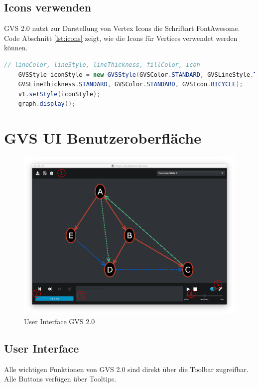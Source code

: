 \documentclass[11pt,a4paper,english,oneside]{book}
\numberwithin{equation}{chapter}
\begin{document}
	\subsection{Icons verwenden}
	GVS 2.0 nutzt zur Darstellung von Vertex Icons die Schriftart FontAwesome. Code Abschnitt \ref{lst:icons} zeigt, wie die Icons für Vertices verwendet werden können.
	
	\begin{lstlisting}[language=java, frame=single, caption={Icons benutzen}, label={lst:icons}]
	// lineColor, lineStyle, lineThickness, fillColor, icon
	GVSStyle iconStyle = new GVSStyle(GVSColor.STANDARD, GVSLineStyle.THROUGH,
	GVSLineThickness.STANDARD, GVSColor.STANDARD, GVSIcon.BICYCLE);
	v1.setStyle(iconStyle);
	graph.display();
	\end{lstlisting}	
	
	\clearpage
	
	\section{GVS UI Benutzeroberfläche}
		\begin{figure}[h!]
		\centering
		\includegraphics[width=0.7\linewidth]{assets/images/gvs-ui-graph}
		\caption{User Interface GVS 2.0}
		\label{fig:gvs-ui-graph}
	\end{figure}

	\subsection{User Interface}
	Alle wichtigen Funktionen von GVS 2.0 sind direkt über die Toolbar zugreifbar. Alle Buttons verfügen über Tooltips. 
	
\end{document}
